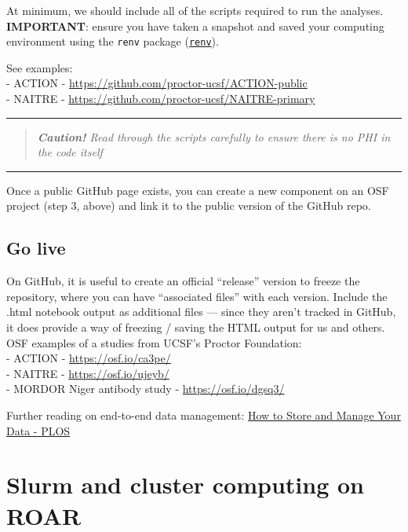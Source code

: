 \documentclass[
]{book}
\begin{document}
At minimum, we should include all of the scripts required to run the analyses. \textbf{IMPORTANT}: ensure you have taken a snapshot and saved your computing environment using the \texttt{renv} package (\hyperref[renv]{\texttt{renv}}).

See examples:\\
- ACTION - \url{https://github.com/proctor-ucsf/ACTION-public}\\
- NAITRE - \url{https://github.com/proctor-ucsf/NAITRE-primary}

\begin{center}\rule{0.5\linewidth}{0.5pt}\end{center}

\begin{quote}
\emph{\textbf{Caution!} Read through the scripts carefully to ensure there is no PHI in the code itself }
\end{quote}

\begin{center}\rule{0.5\linewidth}{0.5pt}\end{center}

Once a public GitHub page exists, you can create a new component on an OSF project (step 3, above) and link it to the public version of the GitHub repo.

\section{Go live}\label{go-live}

On GitHub, it is useful to create an official ``release'' version to freeze the repository, where you can have ``associated files'' with each version. Include the .html notebook output as additional files --- since they aren't tracked in GitHub, it does provide a way of freezing / saving the HTML output for us and others. OSF examples of a studies from UCSF's Proctor Foundation:\\
- ACTION - \url{https://osf.io/ca3pe/}\\
- NAITRE - \url{https://osf.io/ujeyb/}\\
- MORDOR Niger antibody study - \url{https://osf.io/dgsq3/}

Further reading on end-to-end data management: \href{https://plos.org/resource/how-to-store-and-manage-your-data/\#data-management-plan}{How to Store and Manage Your Data - PLOS}

\chapter{Slurm and cluster computing on ROAR}\label{slurm}
\end{document}
